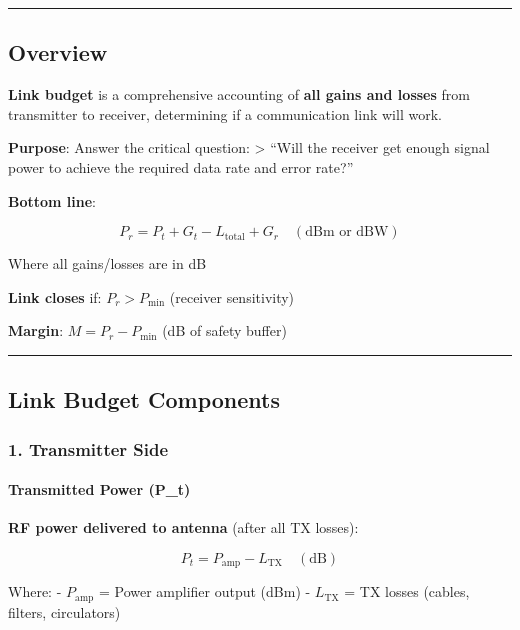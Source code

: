 \begin{center}\rule{0.5\linewidth}{0.5pt}\end{center}

\subsection{Overview}\label{overview}

\textbf{Link budget} is a comprehensive accounting of \textbf{all gains
and losses} from transmitter to receiver, determining if a communication
link will work.

\textbf{Purpose}: Answer the critical question: \textgreater{} ``Will
the receiver get enough signal power to achieve the required data rate
and error rate?''

\textbf{Bottom line}:

\[
P_r = P_t + G_t - L_{\text{total}} + G_r \quad (\text{dBm or dBW})
\]

Where all gains/losses are in dB

\textbf{Link closes} if: \(P_r > P_{\text{min}}\) (receiver sensitivity)

\textbf{Margin}: \(M = P_r - P_{\text{min}}\) (dB of safety buffer)

\begin{center}\rule{0.5\linewidth}{0.5pt}\end{center}

\subsection{Link Budget Components}\label{link-budget-components}

\subsubsection{1. Transmitter Side}\label{transmitter-side}

\paragraph{Transmitted Power (P\_t)}\label{transmitted-power-p_t}

\textbf{RF power delivered to antenna} (after all TX losses):

\[
P_t = P_{\text{amp}} - L_{\text{TX}} \quad (\text{dB})
\]

Where: - \(P_{\text{amp}}\) = Power amplifier output (dBm) -
\(L_{\text{TX}}\) = TX losses (cables, filters, circulators)

